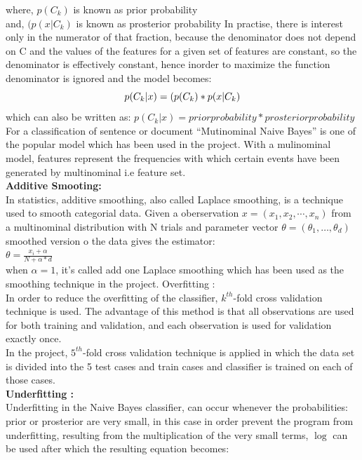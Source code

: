 \documentclass[a4paper, 12pt, onepage]{article}
\begin{document}
\begin{enumerate}
		where, $p(C_{k})$ is known as prior probability
		\\ and, $(p(x|C_{k})$ is known as prosterior probability
		In practise, there is interest only in the numerator of that fraction, because the denominator does not depend on C and the values of the features for a given set of features are constant, so the denominator is effectively constant, hence inorder to maximize the function denominator is ignored and the model becomes:
\\
\begin{equation}
		p(C_{k}|x) = {(p(C_{k}) * p(x|C_{k})}  \\
\end{equation}
	which can also be written as:
	$p(C_{k}|x) = prior probability * prosterior probability$
	For a classification of sentence or document ``Mutinominal Naive Bayes'' is one of the popular model which has been used in the project. With a mulinominal model, features represent the frequencies with which certain events have been generated by multinominal i.e feature set.
	\\
	\textbf{Additive Smooting:} \\
	In statistics, additive smoothing, also called Laplace smoothing, is a technique used to smooth categorial data. Given a oberservation $x = (x_{1},x_{2},\cdots,x_{n})$ from a multinominal distribution with N trials and parameter vector $\theta = (\theta_{1},\ldots,\theta_{d})$ smoothed version o the data gives the estimator:\\
	$\theta = \frac{x_{i} + \alpha}{N+\alpha *d}$ \\
	when $\alpha = 1 $, it's called add one Laplace smoothing which has been used as the smoothing technique in the project.
	Overfitting : \\
	In order to reduce the overfitting of the classifier, $k^{th}$-fold cross validation technique is used. The advantage of this method is that all observations are used for both training and validation, and each observation is used for validation exactly once.\\
	In the project, $5^{th}$-fold cross validation technique is applied in which the data set is divided into the 5 test cases and train cases and classifier is trained on each of those cases.
	\\
	\textbf{Underfitting :}\\
	Underfitting in the Naive Bayes classifier, can occur whenever the probabilities: prior or prosterior are very small, in this case in order prevent the program from underfitting, resulting from the multiplication of the very small terms, $\log$ can be used after which the resulting equation becomes:\\

\end{enumerate}
\end{document}
